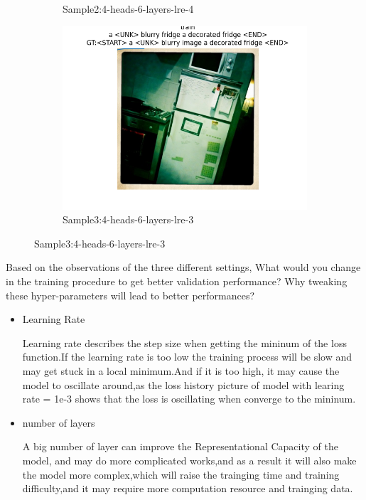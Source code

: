 \documentclass[11pt,addpoints,answers]{exam}
\begin{document}
\begin{questions}
\begin{figure}[H]
\begin{subfigure}[b]{0.32\linewidth}
        \caption{Sample2:4-heads-6-layers-lre-4}
    \end{subfigure}
    \begin{subfigure}[b]{0.32\linewidth}
        \includegraphics[width=\linewidth]{case3_train_3.png}
        \caption{Sample3:4-heads-6-layers-lre-3}
    \end{subfigure}
\end{figure}

\item Based on the observations of the three different settings, What would you change in the training procedure to get better validation performance? Why tweaking these hyper-parameters will lead to better performances?

\begin{solution}
\begin{itemize}
    \item {Learning Rate}
    
    Learning rate describes the step size when getting the mininum of the loss function.If the learning rate is too low the training process will be slow and may get stuck in a local minimum.And if it is too high, it may cause the model to oscillate around,as the loss history picture of model with learing rate = 1e-3  shows that the loss is oscillating when converge to the mininum.

    \item{number of layers}

    A big number of layer can improve the Representational Capacity of the model, and may do more complicated works,and as a result it will also make the model more complex,which will raise the trainging time and training difficulty,and it may require more computation resource and trainging data.


\end{itemize}
\end{solution}
\end{questions}
\end{document}
